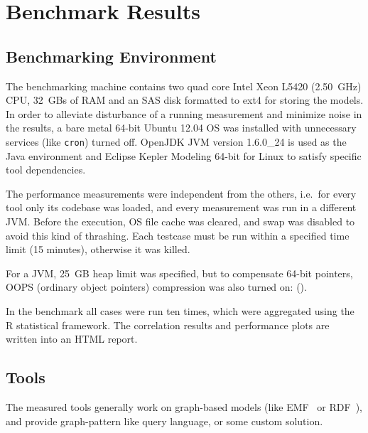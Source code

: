 \chapter{Benchmark Results}

\section{Benchmarking Environment}
\label{sec:environment}

The benchmarking machine contains two quad core Intel Xeon L5420 (2.50~GHz) CPU, 32~GBs of RAM and an SAS disk formatted to ext4 for storing the models. In order to alleviate disturbance of a running measurement and minimize noise in the results, a bare metal 64-bit Ubuntu 12.04 OS was installed with unnecessary services (like \texttt{cron}) turned off. OpenJDK JVM version 1.6.0\_24 is used as the Java environment and Eclipse Kepler Modeling 64-bit for Linux to satisfy specific tool dependencies.

The performance measurements were independent from the others, i.e.\ for every tool only its codebase was loaded, and every measurement was run in a different JVM. Before the execution, OS file cache was cleared, and swap was disabled to avoid this kind of thrashing. Each testcase must be run within a specified time limit (15 minutes), otherwise it was killed.

For a JVM, 25~GB heap limit was specified, but to compensate 64-bit pointers, OOPS (ordinary object pointers) compression was also turned on: ().

In the benchmark all cases were run ten times, which were aggregated using the R statistical framework. The correlation results and performance plots are written into an HTML report.

\section{Tools}
\label{tools}
The measured tools generally work on graph-based models (like EMF~\cite{EMF} or RDF~\cite{RDF}), and provide graph-pattern like query language, or some custom solution.

